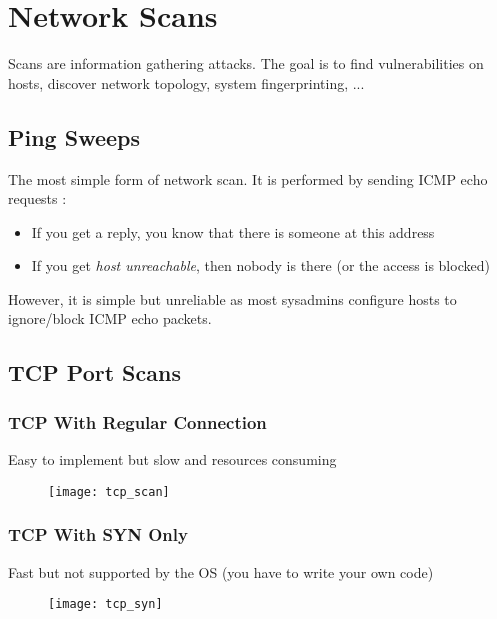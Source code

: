 \chapter{Network Scans}

Scans are information gathering attacks. The goal is to find vulnerabilities on hosts, discover network topology, system fingerprinting, ...

\section{Ping Sweeps}

The most simple form of network scan. It is performed by sending ICMP echo requests :
\begin{itemize}
    \item If you get a reply, you know that there is someone at this address
    \item If you get \textit{host unreachable}, then nobody is there (or the access is blocked)
\end{itemize}

However, it is simple but unreliable as most sysadmins configure hosts to ignore/block ICMP echo packets.

\section{TCP Port Scans}

\begin{minipage}[t]{0.45\textwidth}
    \subsection{TCP With Regular Connection}
    Easy to implement but slow and resources consuming
	\begin{figure}[H]
		\centering
		\texttt{[image: tcp\_scan]}
	\end{figure}
\end{minipage}
\hfill
\begin{minipage}[t]{0.45\textwidth}
    \subsection{TCP With SYN Only}
    Fast but not supported by the OS (you have to write your own code)
	\begin{figure}[H]
		\centering
		\texttt{[image: tcp\_syn]}
	\end{figure}
\end{minipage}

